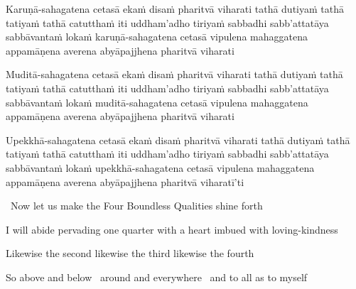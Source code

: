 \medskip

\begin{pali-hang}
  Karuṇā-sahagatena cetasā ekaṁ disaṁ pharitvā viharati tathā dutiyaṁ tathā tatiyaṁ tathā catutthaṁ iti uddham'adho tiriyaṁ sabbadhi sabb'attatāya sabbāvantaṁ lokaṁ karuṇā-sahagatena cetasā vipulena mahaggatena appamāṇena averena abyāpajjhena pharitvā viharati
\end{pali-hang}

\medskip

\begin{pali-hang}
  Muditā-sahagatena cetasā ekaṁ disaṁ pharitvā viharati tathā dutiyaṁ tathā tatiyaṁ tathā catutthaṁ iti uddham'adho tiriyaṁ sabbadhi sabb'attatāya sabbāvantaṁ lokaṁ muditā-sahagatena cetasā vipulena mahaggatena appamāṇena averena abyāpajjhena pharitvā viharati
\end{pali-hang}

\medskip

\begin{pali-hang}
  Upekkhā-sahagatena cetasā ekaṁ disaṁ pharitvā viharati tathā dutiyaṁ tathā tatiyaṁ tathā catutthaṁ iti uddham'adho tiriyaṁ sabbadhi sabb'attatāya sabbāvantaṁ lokaṁ upekkhā-sahagatena cetasā vipulena mahaggatena appamāṇena averena abyāpajjhena pharitvā viharatī'ti
\end{pali-hang}

\clearpage

\begin{leader-english}
  \anglebracketleft\ \hspace{-0.5mm}Now let us make the Four Boundless Qualities shine forth \hspace{-0.5mm}\anglebracketright\
\end{leader-english}

\smallskip

\begin{english-hang}
  I will abide pervading one quarter with a heart imbued with loving-kindness
\end{english-hang}

\begin{english}
  Likewise the second likewise the third likewise the fourth\\
\end{english}
\begin{english-hang}
  So above and below \breathmark\ around and everywhere \breathmark\ and to all as to myself\makeatletter\hyperlink{endnote96-appendix}\makeatother\\
\end{english-hang}

